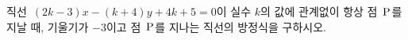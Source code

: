 직선~$(2k-3)x-(k+4)y+4k+5=0$이 실수 $k$의 값에 관계없이 항상 점~$\mathrm{P}$를 지날 때, 기울기가 $-3$이고 점~$\mathrm{P}$를 지나는 직선의 방정식을 구하시오.
